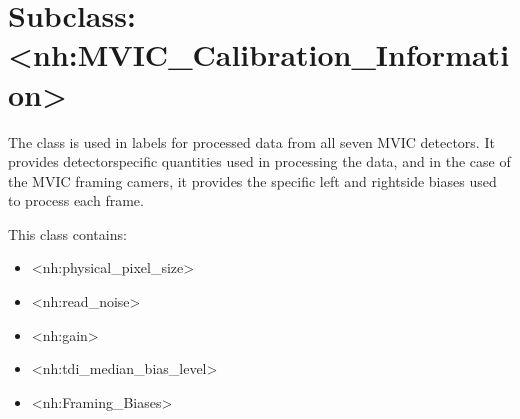 \documentclass[letterpaper,10pt,english]{sphinxmanual}
\begin{document}
\section{Subclass: \textless{}nh:MVIC\_Calibration\_Information\textgreater{}}
\label{\detokenize{user/user-guide:subclass-nh-mvic-calibration-information}}\label{\detokenize{user/user-guide:mvic-calibration-information}}
\sphinxAtStartPar
The  class is used in labels for processed
data from all seven MVIC detectors. It provides detector\sphinxhyphen{}specific quantities
used in processing the data, and in the case of the MVIC framing camers, it
provides the specific left\sphinxhyphen{} and right\sphinxhyphen{}side biases used to process each frame.

\sphinxAtStartPar
This class contains:
\begin{itemize}
\item {} 
\sphinxAtStartPar
\textless{}nh:physical\_pixel\_size\textgreater{}

\item {} 
\sphinxAtStartPar
\textless{}nh:read\_noise\textgreater{}

\item {} 
\sphinxAtStartPar
\textless{}nh:gain\textgreater{}

\item {} 
\sphinxAtStartPar
\textless{}nh:tdi\_median\_bias\_level\textgreater{}

\item {} 
\sphinxAtStartPar
\textless{}nh:Framing\_Biases\textgreater{}

\end{itemize}
\end{document}
